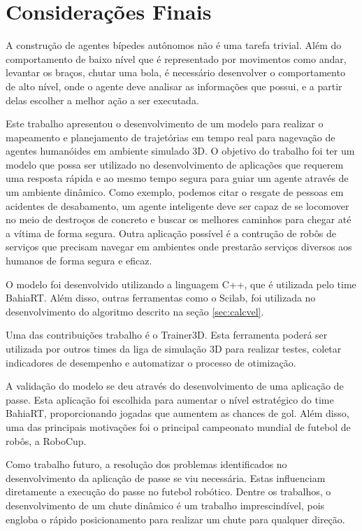 \chapter{Considerações Finais}
\label{chap:conclusao}

A construção de agentes bípedes aut\^onomos não é uma tarefa trivial. Além 
do comportamento de baixo nível que é representado por movimentos como andar, levantar os braços, chutar uma bola, 
é necessário desenvolver o comportamento de alto nível, onde o agente deve analisar as informações que possui, e 
a partir delas escolher a melhor ação a ser executada.

Este trabalho apresentou o desenvolvimento de um modelo para realizar o mapeamento e planejamento 
de trajetórias em tempo real para nagevação de agentes humanóides em ambiente simulado 3D. O objetivo 
do trabalho foi ter um modelo que possa ser utilizado no desenvolvimento de aplicações que 
requerem uma resposta rápida e ao mesmo tempo segura para guiar um agente através de um ambiente din\^amico. Como exemplo, podemos citar o resgate de pessoas em acidentes 
de desabamento, um agente inteligente deve ser capaz de se locomover no meio de destroços de concreto e buscar os 
melhores caminhos para chegar até a vítima de forma segura. Outra aplicação possível é a contrução de 
robôs de serviços que precisam navegar em ambientes onde prestarão serviços diversos aos humanos de forma 
segura e eficaz.

O modelo foi desenvolvido utilizando a linguagem C++, que é utilizada pelo time BahiaRT. Além disso, outras ferramentas 
como o Scilab, foi utilizada no desenvolvimento do algoritmo descrito na seção \ref{sec:calcvel}. 

Uma das contribuições trabalho é o Trainer3D. Esta ferramenta poderá ser utilizada por outros times da liga de simulação 3D 
para realizar testes, coletar indicadores de desempenho e automatizar o processo de otimização.

A validação do modelo se deu através do desenvolvimento de uma aplicação de passe. Esta aplicação foi escolhida 
para aumentar o nível estratégico do time BahiaRT, proporcionando jogadas que aumentem as chances de gol. Além disso, 
uma das principais motivações foi o principal campeonato mundial de futebol de rob\^os, a RoboCup.

Como trabalho futuro, a resolução dos problemas identificados no desenvolvimento da aplicação de passe se viu necessária. 
Estas influenciam diretamente a execução do passe no futebol robótico. Dentre os trabalhos, o desenvolvimento de um chute 
din\^amico é um trabalho imprescindível, pois engloba o rápido posicionamento para realizar um chute para qualquer direção.